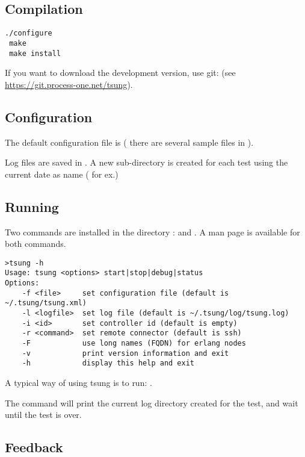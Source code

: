\documentclass{TSUNG-en}
\begin{document}
\subsection{Compilation}

\begin{Verbatim}
./configure
 make
 make install
\end{Verbatim}

If you want to download the development version, use git:  (see \url{https://git.process-one.net/tsung}).

\subsection{Configuration}

The default configuration file is  (
there are several sample files in
).

Log files are saved in  . A new sub-directory
is created for each test using the current date as name
( for ex.)

\subsection{Running}

Two commands are installed in the directory :
 and . A man page is available
for both commands.

\begin{Verbatim}
>tsung -h
Usage: tsung <options> start|stop|debug|status
Options:
    -f <file>     set configuration file (default is ~/.tsung/tsung.xml)
    -l <logfile>  set log file (default is ~/.tsung/log/tsung.log)
    -i <id>       set controller id (default is empty)
    -r <command>  set remote connector (default is ssh)
    -F            use long names (FQDN) for erlang nodes
    -v            print version information and exit
    -h            display this help and exit
\end{Verbatim}

A typical way of using tsung is to run:
.

The command will print the current log directory created for the test, and wait until the test is
over.

\subsection{Feedback}
\end{document}
